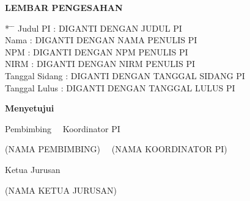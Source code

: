 \newpage
{}
\begin{center}
{\large \bf \centering LEMBAR PENGESAHAN}
\end{center}

\vspace{0.75cm}

\begin{tabbing}*
  \hspace{3.5cm}\=\hspace{0.25cm}  \=\hspace{0.5cm} \kill
  Judul PI \> : \> DIGANTI DENGAN JUDUL PI \\
  Nama \> : \> DIGANTI DENGAN NAMA PENULIS PI \\
  NPM \> : \> DIGANTI DENGAN NPM PENULIS PI \\
  NIRM \> : \> DIGANTI DENGAN NIRM PENULIS PI \\
  Tanggal Sidang \> : \> DIGANTI DENGAN TANGGAL SIDANG PI \\
  Tanggal Lulus \> : \> DIGANTI DENGAN TANGGAL LULUS PI
\end{tabbing}


\begin{center}
\vspace{1cm}

{\bf Menyetujui}

\vspace{0.5cm}

{Pembimbing~ \hspace{5.0cm} ~Koordinator PI}%

\vspace{2.0cm}

{(NAMA PEMBIMBING)~ \hfill ~(NAMA KOORDINATOR PI)}%

\vspace{0.5cm}

 Ketua Jurusan\\
 \vspace{2.0cm}

(NAMA KETUA JURUSAN)

\end{center}

